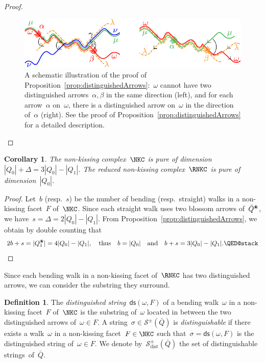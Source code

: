 \documentclass{memo-l}
\newtheorem{corollary}[theorem]{Corollary}
\theoremstyle{definition}
\newtheorem{definition}[theorem]{Definition}
\newcommand{\darkblue}{\color{darkblue}} %
\newcommand{\defn}[1]{\textsl{\darkblue #1}} %
\newcommand{\blossom}{^\text{\ding{96}}} %
\newcommand{\strings}{\mathcal{S}} %
\newcommand{\distinguishableStrings}{\mathcal{S}_\mathrm{dist}} %
\newcommand{\distinguishedString}[2]{\mathsf{ds}(#1,#2)} %
\begin{document}
\begin{proof}
\begin{figure}[t]
	\capstart
	\centerline{\includegraphics[scale=1]{pure}}
	\caption{A schematic illustration of the proof of Proposition~\ref{prop:distinguishedArrows}:~$\omega$ cannot have two distinguished arrows~$\alpha, \beta$ in the same direction (left), and for each arrow~$\alpha$ on~$\omega$, there is a distinguished arrow on~$\omega$ in the direction of~$\alpha$ (right). See the proof of Proposition~\ref{prop:distinguishedArrows} for a detailed description.}
	\label{fig:pure}
\end{figure}
\end{proof}

\begin{corollary}
\label{coro:pure}
The non-kissing complex~$\NKC$ is pure of dimension $|Q_0| + \Delta = 3|Q_0|-|Q_1|$. The reduced non-kissing complex~$\RNKC$ is pure of dimension~$|Q_0|$.
\end{corollary}

\begin{proof}
Let~$b$ (resp.~$s$) be the number of bending (resp.~straight) walks in a non-kissing facet~$F$ of~$\NKC$.
Since each straight walk uses two blossom arrows of~$\bar Q\blossom$, we have~$s = \Delta = 2|Q_0|-|Q_1|$.
From Proposition~\ref{prop:distinguishedArrows}, we obtain by double counting that
\[
2b+s = |Q\blossom_1| = 4|Q_0|-|Q_1|,
\quad\text{thus}\quad
b = |Q_0|
\quad\text{and}\quad
b+s = 3|Q_0|-|Q_1|.
\qedhere
\]
\end{proof}

Since each bending walk in a non-kissing facet of~$\RNKC$ has two distinguished arrows, we can consider the substring they surround.

\begin{definition}
\label{def:distinguishedSubstring}
The \defn{distinguished string}~$\distinguishedString{\omega}{F}$ of a bending walk~$\omega$ in a non-kissing facet~$F$ of~$\NKC$ is the substring of~$\omega$ located in between the two distinguished arrows of~$\omega \in F$.
A string~${\sigma \in \strings^\pm(\bar Q)}$ is \defn{distinguishable} if there exists a walk~$\omega$ in a non-kissing facet~$F \in \NKC$ such that~$\sigma = \distinguishedString{\omega}{F}$ is the distinguished string of~$\omega \in F$.
We denote by~$\distinguishableStrings^\pm(\bar Q)$ the set of distinguishable strings~of~$\bar Q$.
\end{definition}
\end{document}
